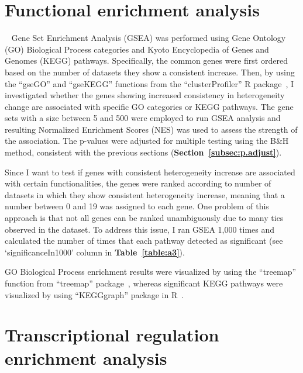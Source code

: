 \section{Functional enrichment analysis}~\label{sec:func}
Gene Set Enrichment Analysis (GSEA) was performed using Gene Ontology (GO) Biological Process categories and Kyoto Encyclopedia of Genes and Genomes (KEGG) pathways.
Specifically, the common genes were first ordered based on the number of datasets they show a consistent increase.
Then, by using the ``gseGO'' and ``gseKEGG'' functions from the ``clusterProfiler'' R package~\cite{clusterProfiler}, 
I investigated whether the genes showing increased consistency in heterogeneity change are associated with specific GO categories or KEGG pathways.
The gene sets with a size between 5 and 500 were employed to run GSEA analysis and resulting Normalized Enrichment Scores (NES) was used to assess the strength of the association.
The p-values were adjusted for multiple testing using the B{\&}H method, consistent with the previous sections (\textbf{Section~\ref{subsec:p.adjust}}).

Since I want to test if genes with consistent heterogeneity increase are associated with certain functionalities, 
the genes were ranked according to number of datasets in which they show consistent heterogeneity increase, meaning that a number between 0 and 19 was assigned to each gene.
One problem of this approach is that not all genes can be ranked unambiguously due to many ties observed in the dataset. 
To address this issue, I ran GSEA 1,000 times and calculated the number of times that each pathway detected as significant (see `significanceIn1000' column in \textbf{Table~\ref{table:a3}}).

GO Biological Process enrichment results were visualized by using the ``treemap'' function from ``treemap'' package~\cite{treemap2021}, 
whereas significant KEGG pathways were visualized by using ``KEGGgraph'' package in R~\cite{KEGGgraph}.

\section{Transcriptional regulation enrichment analysis}


